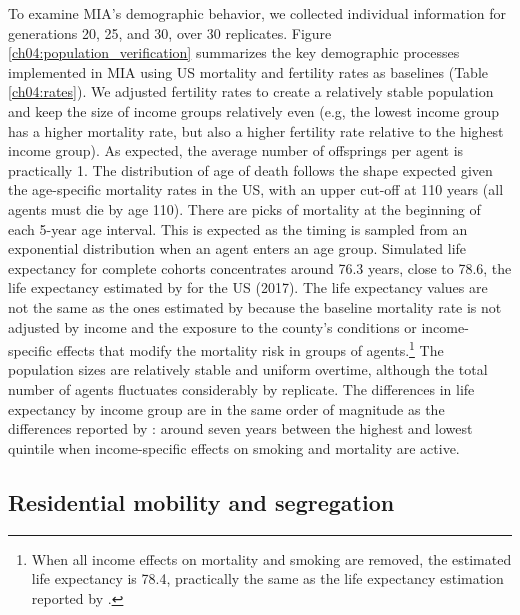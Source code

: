 To examine MIA's demographic behavior, we collected individual information for generations 20, 25, and 30, over 30 replicates. Figure \ref{ch04:population_verification} summarizes the key demographic processes implemented in MIA using US mortality and fertility rates as baselines (Table \ref{ch04:rates}). We adjusted fertility rates to create a relatively stable population and keep the size of income groups relatively even (e.g, the lowest income group has a higher mortality rate, but also a higher fertility rate relative to the highest income group). As expected, the average number of offsprings per agent is practically 1. The distribution of age of death follows the shape expected given the age-specific mortality rates in the US, with an upper cut-off at 110 years (all agents must die by age 110). There are picks of mortality at the beginning of each 5-year age interval. This is expected as the timing is sampled from an exponential distribution when an agent enters an age group. Simulated life expectancy for complete cohorts concentrates around 76.3 years, close to 78.6, the life expectancy estimated by \citet{kochanek2019} for the US (2017). The life expectancy values are not the same as the ones estimated by \citet{kochanek2019} because the baseline mortality rate is not adjusted by income and the exposure to the county's conditions or income-specific effects that modify the mortality risk in groups of agents.\footnote{When all income effects on mortality and smoking are removed, the estimated life expectancy is 78.4, practically the same as the life expectancy estimation reported by \citet{kochanek2019}.} The population sizes are relatively stable and uniform overtime, although the total number of agents fluctuates considerably by replicate. The differences in life expectancy by income group are in the same order of magnitude as the differences reported by \citet{chetty2016}: around seven years between the highest and lowest quintile when income-specific effects on smoking and mortality are active.



\newpage


\subsection{Residential mobility and segregation}\label{ch04:appendix_segregation}

